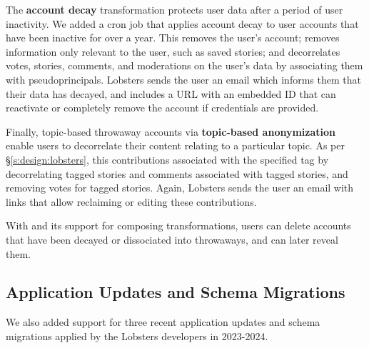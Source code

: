 The \textbf{account decay} transformation protects
user data after a period of user inactivity.
%
We added a cron job that applies account decay to
user accounts that have been inactive for over a year.
%
This
\one{} removes the user's account;
\two{} removes information only relevant to the user, such as saved stories;
\three{} and decorrelates votes, stories, comments, and moderations on the
user's data by associating them with pseudoprincipals.
%
%
%
%
Lobsters sends the user an email which informs them that their data has
decayed, and includes a URL with an embedded \xx ID that can reactivate or
completely remove the account if credentials are provided.
%

Finally, topic-based throwaway accounts via \textbf{topic-based
anonymization}
enable users to decorrelate their content relating to a particular topic.
%
As per \S\ref{s:design:lobsters}, this \xxs contributions associated with the
specified tag by \one{} decorrelating tagged stories and comments associated with
tagged stories, and \two{} removing votes for tagged stories.
%
Again, Lobsters sends the user an email with links that allow reclaiming or
editing these contributions.
%

%
With \sys and its support for composing \xxing transformations, users can
delete accounts that have been decayed or dissociated into throwaways, and
can later reveal them.

%

\subsection{Application Updates and Schema Migrations}
\label{s:casestudies:updates}
We also added support for three recent application updates and schema
migrations applied by the Lobsters developers in 2023-2024. 

